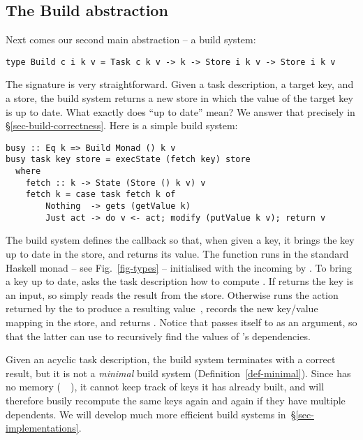 \subsection{The Build abstraction}\label{sec-general-build}

Next comes our second main abstraction -- a build system:
\vspace{1mm}
\begin{verbatim}
type Build c i k v = Task c k v -> k -> Store i k v -> Store i k v
\end{verbatim}
\vspace{1mm}
The signature is very straightforward.  Given a task description, a target key,
and a store, the build system returns a new store in which the value of the
target key is up to date. What exactly does ``up to date'' mean?  We answer
that precisely in \S\ref{sec-build-correctness}. Here is a simple build system:

\vspace{1mm}
\begin{verbatim}
busy :: Eq k => Build Monad () k v
busy task key store = execState (fetch key) store
  where
    fetch :: k -> State (Store () k v) v
    fetch k = case task fetch k of
        Nothing  -> gets (getValue k)
        Just act -> do v <- act; modify (putValue k v); return v
\end{verbatim}
\vspace{1mm}

\noindent
The  build system defines the callback  so that, when given a
key, it brings the key up to date in the store, and returns its value.
The function  runs in the standard Haskell  monad -- see
Fig.~\ref{fig-types} -- initialised with the incoming  by .
To bring a key up to date,  asks the task description  how
to compute . If  returns  the key is an input, so
 simply reads the result from the store. Otherwise  runs
the action  returned by the  to produce a resulting
value~, records the new key/value mapping in the store, and returns .
Notice that  passes itself to  as an argument, so that the
latter can use  to recursively find the values of 's dependencies.

Given an acyclic task description, the  build system terminates with a
correct result, but it is not a \emph{minimal} build system
(Definition~\ref{def-minimal}). Since  has no memory
(~\hs{=}~\hs{()}), it cannot keep track of keys it has already built, and
will therefore busily recompute the same keys again and again if they have
multiple dependents. We will develop much more efficient build systems
in~\S\ref{sec-implementations}.

